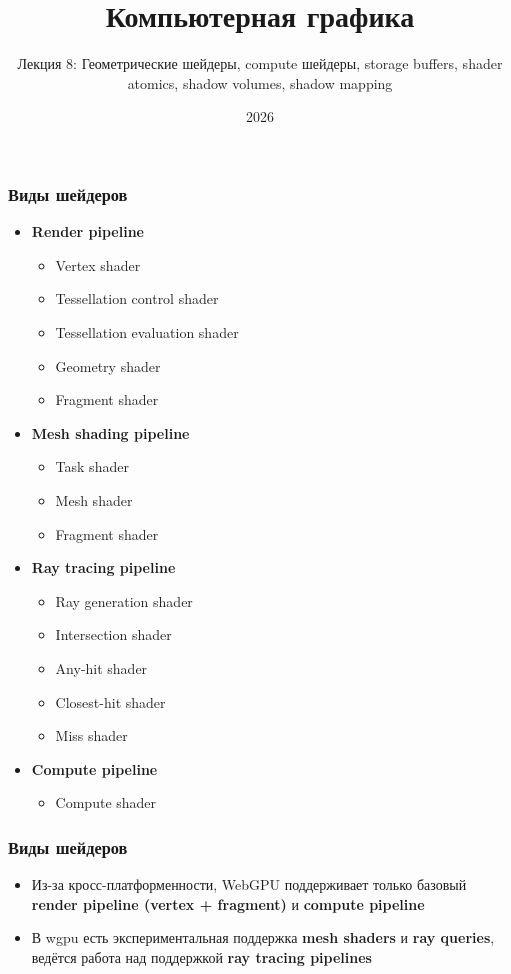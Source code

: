 \documentclass[10pt]{beamer}
\title{Компьютерная графика}
\subtitle{Лекция 8: Геометрические шейдеры, compute шейдеры, storage buffers, shader atomics, shadow volumes, shadow mapping}
\date{2026}
\begin{document}

\frame{\titlepage}

\begin{frame}[fragile]
\frametitle{Виды шейдеров}
\begin{itemize}
\item \textbf{Render pipeline}
\begin{itemize}
\item Vertex shader
\item Tessellation control shader
\item Tessellation evaluation shader
\item Geometry shader
\item Fragment shader
\end{itemize}
\pause
\item \textbf{Mesh shading pipeline}
\begin{itemize}
\item Task shader
\item Mesh shader
\item Fragment shader
\end{itemize}
\pause
\item \textbf{Ray tracing pipeline}
\begin{itemize}
\item Ray generation shader
\item Intersection shader
\item Any-hit shader
\item Closest-hit shader
\item Miss shader
\end{itemize}
\pause
\item \textbf{Compute pipeline}
\begin{itemize}
\item Compute shader
\end{itemize}
\end{itemize}
\end{frame}

\begin{frame}[fragile]
\frametitle{Виды шейдеров}
\begin{itemize}
\item Из-за кросс-платформенности, WebGPU поддерживает только базовый \textbf{render pipeline (vertex + fragment)} и \textbf{compute pipeline}
\pause
\item В wgpu есть экспериментальная поддержка \textbf{mesh shaders} и \textbf{ray queries}, ведётся работа над поддержкой \textbf{ray tracing pipelines}
\end{itemize}
\end{frame}
\end{document}
